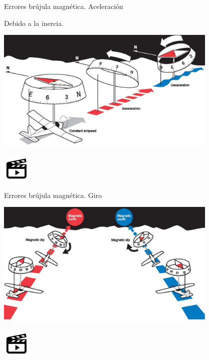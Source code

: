 \begin{frame}{Errores br\'ujula magn\'etica. Aceleraci\'on}

Debido a la inercia. 

  \begin{center}
\includegraphics[width=0.80\textwidth]{05.instrumentos.giroscopicos.imagenes/05.04.MagnetismoTerrestre/05-04-brujula_error_aceleracion.jpg}
\end{center}
  
\href{https://www.youtube.com/watch?v=vUz09IpYCuY}{\includegraphics[width=0.10\textwidth]{05.IyA.imagenes/Video.png}}


\end{frame}

\begin{frame}{Errores br\'ujula magn\'etica. Giro}


  \begin{center}
\includegraphics[width=0.80\textwidth]{05.instrumentos.giroscopicos.imagenes/05.04.MagnetismoTerrestre/05-04-brujula_error_giro.jpg}
\end{center}
  
  
\href{https://www.youtube.com/watch?v=WqXujnDw-kE}{\includegraphics[width=0.10\textwidth]{05.IyA.imagenes/Video.png}}

\end{frame}